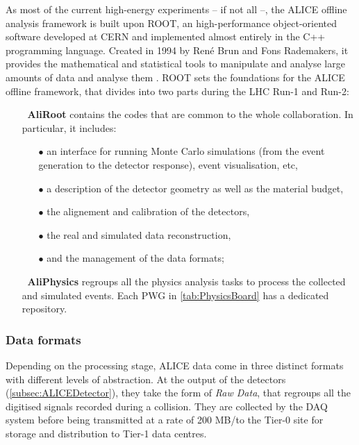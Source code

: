 As most of the current high-energy experiments -- if not all --, the ALICE offline analysis framework is built upon ROOT, an high-performance object-oriented software developed at CERN and implemented almost entirely in the C++ programming language. Created in 1994 by René Brun and Fons Rademakers, it provides the mathematical and statistical tools to manipulate and analyse large amounts of data and analyse them \cite{renebrunandfonsrademakersROOTObjectOriented2023}. ROOT sets the foundations for the ALICE offline framework, that divides into two parts during the LHC Run-1 and Run-2:
\begin{itemize}
\item[$\ $] \textbf{AliRoot} \cite{alicecollaborationAliRoot2023} contains the codes that are common to the whole collaboration. In particular, it includes:
\begin{itemize}
\item[$\bullet$] an interface for running Monte Carlo simulations (from the event generation to the detector response), event visualisation, etc,
\item[$\bullet$] a description of the detector geometry as well as the material budget,
\item[$\bullet$] the alignement and calibration of the detectors, 
\item[$\bullet$] the real and simulated data reconstruction,
\item[$\bullet$] and the management of the data formats;
\end{itemize}
\item[$\ $] \textbf{AliPhysics} \cite{alicecollaborationAliPhysics2023} regroups all the physics analysis tasks to process the collected and simulated events. Each PWG in \tab\ref{tab:PhysicsBoard} has a dedicated repository.
\end{itemize}

\subsubsection{Data formats}
\label{subsubsec:DataFormats}

Depending on the processing stage, ALICE data come in three distinct formats with different levels of abstraction. At the output of the detectors (\Sec\ref{subsec:ALICEDetector}), they take the form of \textit{Raw Data}, that regroups all the digitised signals recorded during a collision. They are collected by the DAQ system before being transmitted at a rate of 200 MB/\second to the Tier-0 site for storage and distribution to Tier-1 data centres. 

